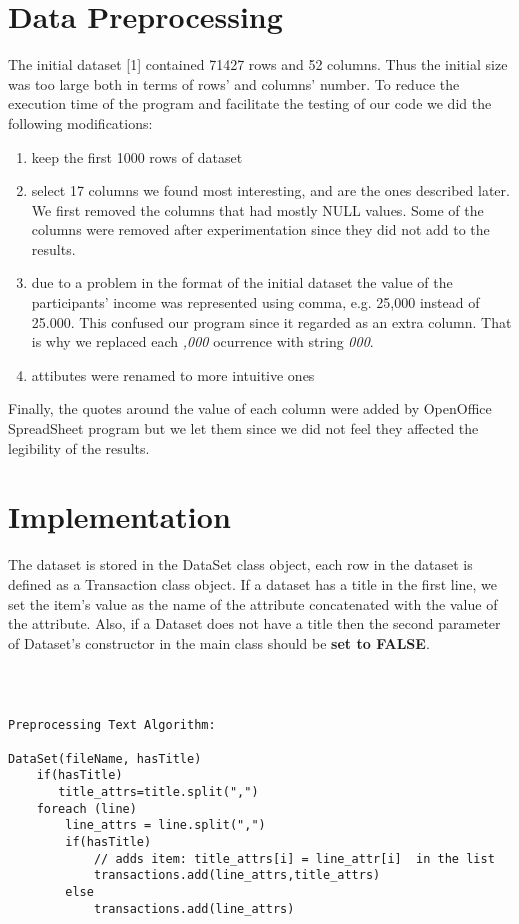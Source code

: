 \documentclass[11pt]{article}
\begin{document}
\section{Data Preprocessing}

The initial dataset [1] contained 71427 rows and 52 columns. Thus the initial size was too large both in terms of rows' and columns' number. To reduce the execution time of the program and facilitate the testing of our code we did the following modifications:
\begin{enumerate}
   \item keep the first 1000 rows of dataset
   \item select 17 columns we found most interesting, and are the ones described later. We first removed the columns that had mostly NULL values. Some of the columns were removed after      experimentation since they did not add to the results.
   \item due to a problem in the format of the initial dataset the value of the participants' income was represented using comma, e.g. 25,000 instead of 25.000. This confused our program since it regarded as an extra column. That is why we replaced each  \textit{,000} ocurrence with string  \textit{000}.
   \item attibutes were renamed to more intuitive ones
\end{enumerate}
Finally, the quotes around the value of each column were added by OpenOffice SpreadSheet program but we let them since we did not feel they affected the legibility of the results.

\section{Implementation}

The dataset is stored in the DataSet class object, each row in the dataset is defined as a Transaction class object. If a dataset has a title in the first line, we set the item's value as the name of the attribute concatenated with the value of the attribute. Also, if a Dataset does not have a title then the second parameter of Dataset's constructor in the main class should be \textbf{set to FALSE}.


\begin{verbatim}



Preprocessing Text Algorithm:

DataSet(fileName, hasTitle)
    if(hasTitle)
       title_attrs=title.split(",")
    foreach (line)
        line_attrs = line.split(",")
        if(hasTitle)
            // adds item: title_attrs[i] = line_attr[i]  in the list
            transactions.add(line_attrs,title_attrs)
        else
            transactions.add(line_attrs)
\end{verbatim}
\end{document}
